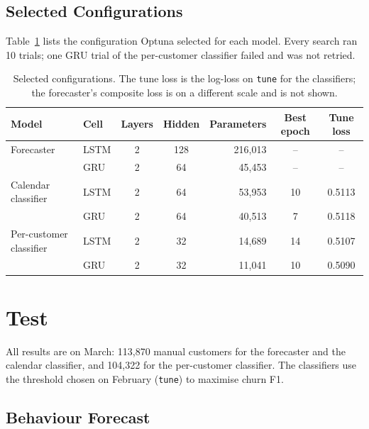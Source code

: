\documentclass{article}
\begin{document}
\subsection{Selected Configurations}

Table~\ref{tab:w2_best} lists the configuration Optuna selected for each model. Every search ran 10 trials; one GRU trial of the per-customer classifier failed and was not retried.

\begin{table}[H]
\centering
\renewcommand{\arraystretch}{1.3}
\begin{tabular}{|l|l|c|c|r|c|c|}
\hline
\textbf{Model} & \textbf{Cell} & \textbf{Layers} & \textbf{Hidden} & \textbf{Parameters} & \textbf{Best epoch} & \textbf{Tune loss} \\ \hline
Forecaster          & LSTM & 2 & 128 & 216{,}013 & -- & -- \\ \hline
                    & GRU  & 2 & 64  & 45{,}453  & -- & -- \\ \hline
Calendar classifier & LSTM & 2 & 64  & 53{,}953  & 10 & 0.5113 \\ \hline
                    & GRU  & 2 & 64  & 40{,}513  & 7  & 0.5118 \\ \hline
Per-customer classifier & LSTM & 2 & 32 & 14{,}689 & 14 & 0.5107 \\ \hline
                    & GRU  & 2 & 32  & 11{,}041  & 10 & 0.5090 \\ \hline
\end{tabular}
\caption{Selected configurations. The tune loss is the log-loss on \texttt{tune} for the classifiers; the forecaster's composite loss is on a different scale and is not shown.}
\label{tab:w2_best}
\end{table}

\section{Test}

All results are on March: 113{,}870 manual customers for the forecaster and the calendar classifier, and 104{,}322 for the per-customer classifier. The classifiers use the threshold chosen on February (\texttt{tune}) to maximise churn F1.

\subsection{Behaviour Forecast}
\end{document}
